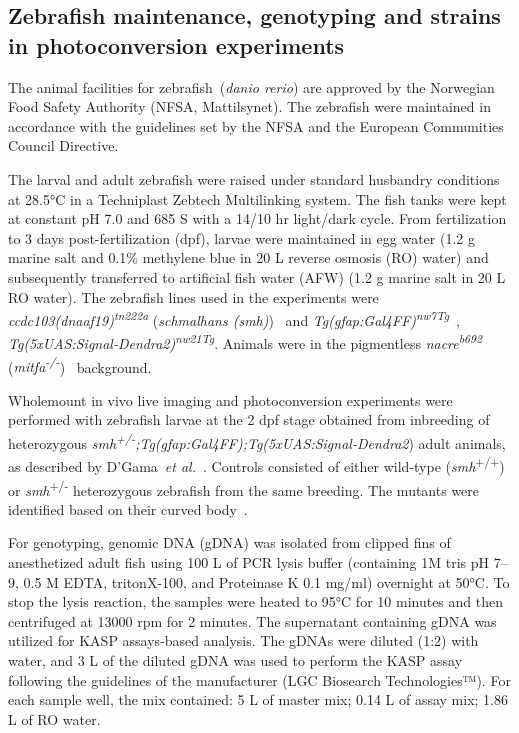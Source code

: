 \documentclass{WileyMSP-template}
\begin{document}
\subsection{Zebrafish maintenance, genotyping and strains in photoconversion experiments}
The animal facilities for zebrafish~(\emph{danio rerio}) are approved by the
Norwegian Food Safety Authority (NFSA, Mattilsynet).
The zebrafish were maintained in accordance with the guidelines set by the
NFSA and the European Communities Council Directive.

The larval and adult zebrafish were raised under standard husbandry
conditions at 28.5°C in a Techniplast Zebtech Multilinking system.
The fish tanks were kept at constant pH 7.0 and 685 \textmu S with a
14/10 hr light/dark cycle.
From fertilization to 3 days post-fertilization (dpf), larvae were maintained in egg
water (1.2 g marine salt and 0.1\% methylene blue in 20 L reverse osmosis (RO) water)
and subsequently transferred to artificial fish water (AFW)
(1.2 g marine salt in 20 L RO water). The zebrafish lines used in the experiments were
\emph{ccdc103(dnaaf19)\textsuperscript{tn222a}}
(\emph{schmalhans (smh)})~\cite{Jau-NianChen1997Left-rightZebrafish}
and \emph{Tg(gfap:Gal4FF)\textsuperscript{nw7Tg}}~\cite{DiazVerdugo2019Glia-neuronSeizures},
\emph{Tg(5xUAS:Signal-Dendra2)\textsuperscript{nw21Tg}}.
Animals were in the pigmentless \emph{nacre\textsuperscript{b692}}
(\emph{mitfa\textsuperscript{-/-}})~\cite{JamesA.Lister1999NacreFate} background.

Wholemount in vivo live imaging and photoconversion
experiments were performed with zebrafish larvae at the 2 dpf stage obtained from inbreeding of heterozygous
\emph{smh\textsuperscript{+/-};Tg(gfap:Gal4FF);Tg(5xUAS:Signal-Dendra2})
adult animals, as described by D'Gama~\emph{et al.}~\cite{DGama2024Cilia-mediatedBrain}.
Controls consisted of either wild-type (\emph{smh}\textsuperscript{+/+})
or \emph{smh}\textsuperscript{+/-} heterozygous zebrafish from the same breeding.
The mutants were identified based on their curved body~\cite{Jau-NianChen1997Left-rightZebrafish}.

For genotyping, genomic DNA (gDNA) was isolated from clipped fins of anesthetized adult
fish using 100 \textmu L of PCR lysis buffer (containing 1M tris pH 7--9, 0.5 M EDTA,
tritonX-100, and Proteinase K 0.1 mg/ml) overnight at 50°C.
To stop the lysis reaction, the samples were heated to 95°C for 10 minutes
and then centrifuged at 13000 rpm for 2 minutes.
The supernatant containing gDNA was utilized for KASP assays-based analysis.
The gDNAs were diluted (1:2) with water, and 3 \textmu L of the diluted gDNA was
used to perform the KASP assay following the guidelines of the manufacturer (LGC Biosearch Technologies™).
For each sample well, the  mix contained: 5 \textmu L of master mix; 0.14
\textmu L of assay mix; 1.86 \textmu L of RO water.
\end{document}

